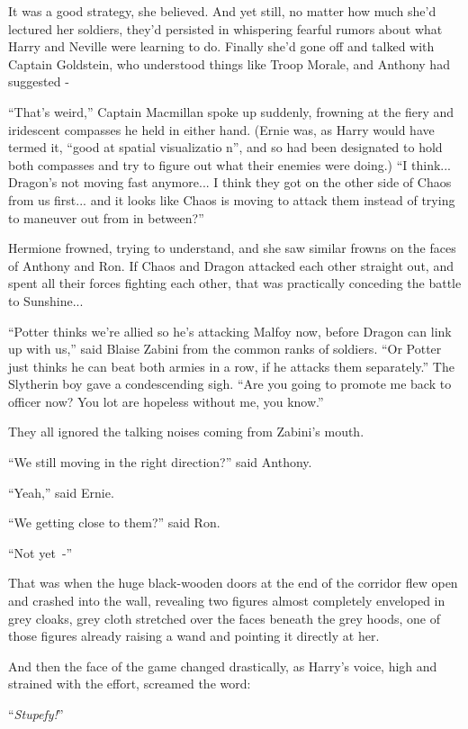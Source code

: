 It was a good strategy, she believed. And yet still, no matter how much she'd lectured her soldiers, they'd persisted in whispering fearful rumors about what Harry and Neville were learning to do. Finally she'd gone off and talked with Captain Goldstein, who understood things like Troop Morale, and Anthony had suggested -

``That's weird,'' Captain Macmillan spoke up suddenly, frowning at the fiery and iridescent compasses he held in either hand. (Ernie was, as Harry would have termed it, ``good at spatial visualizatio n'', and so had been designated to hold both compasses and try to figure out what their enemies were doing.) ``I think... Dragon's not moving fast anymore... I think they got on the other side of Chaos from us first... and it looks like Chaos is moving to attack them instead of trying to maneuver out from in between?''

Hermione frowned, trying to understand, and she saw similar frowns on the faces of Anthony and Ron. If Chaos and Dragon attacked each other straight out, and spent all their forces fighting each other, that was practically conceding the battle to Sunshine...

``Potter thinks we're allied so he's attacking Malfoy now, before Dragon can link up with us,'' said Blaise Zabini from the common ranks of soldiers. ``Or Potter just thinks he can beat both armies in a row, if he attacks them separately.'' The Slytherin boy gave a condescending sigh. ``Are you going to promote me back to officer now? You lot are hopeless without me, you know.''

They all ignored the talking noises coming from Zabini's mouth.

``We still moving in the right direction?'' said Anthony.

``Yeah,'' said Ernie.

``We getting close to them?'' said Ron.

``Not yet~-''

That was when the huge black-wooden doors at the end of the corridor flew open and crashed into the wall, revealing two figures almost completely enveloped in grey cloaks, grey cloth stretched over the faces beneath the grey hoods, one of those figures already raising a wand and pointing it directly at her.

And then the face of the game changed drastically, as Harry's voice, high and strained with the effort, screamed the word:

``\emph{Stupefy!}''

